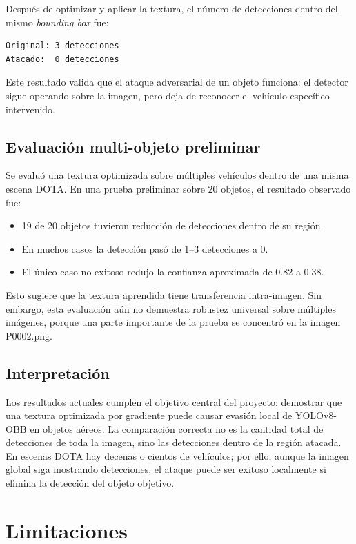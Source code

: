 \documentclass[12pt,a4paper]{article}
\begin{document}
Después de optimizar y aplicar la textura, el número de detecciones dentro del mismo \textit{bounding box} fue:

\begin{verbatim}
Original: 3 detecciones
Atacado:  0 detecciones
\end{verbatim}

Este resultado valida que el ataque adversarial de un objeto funciona: el detector sigue operando sobre la imagen, pero deja de reconocer el vehículo específico intervenido.

\subsection{Evaluación multi-objeto preliminar}

Se evaluó una textura optimizada sobre múltiples vehículos dentro de una misma escena DOTA. En una prueba preliminar sobre 20 objetos, el resultado observado fue:

\begin{itemize}
    \item 19 de 20 objetos tuvieron reducción de detecciones dentro de su región.
    \item En muchos casos la detección pasó de 1--3 detecciones a 0.
    \item El único caso no exitoso redujo la confianza aproximada de 0.82 a 0.38.
\end{itemize}

Esto sugiere que la textura aprendida tiene transferencia intra-imagen. Sin embargo, esta evaluación aún no demuestra robustez universal sobre múltiples imágenes, porque una parte importante de la prueba se concentró en la imagen P0002.png.

\subsection{Interpretación}

Los resultados actuales cumplen el objetivo central del proyecto: demostrar que una textura optimizada por gradiente puede causar evasión local de YOLOv8-OBB en objetos aéreos. La comparación correcta no es la cantidad total de detecciones de toda la imagen, sino las detecciones dentro de la región atacada. En escenas DOTA hay decenas o cientos de vehículos; por ello, aunque la imagen global siga mostrando detecciones, el ataque puede ser exitoso localmente si elimina la detección del objeto objetivo.

\section{Limitaciones}
\end{document}

